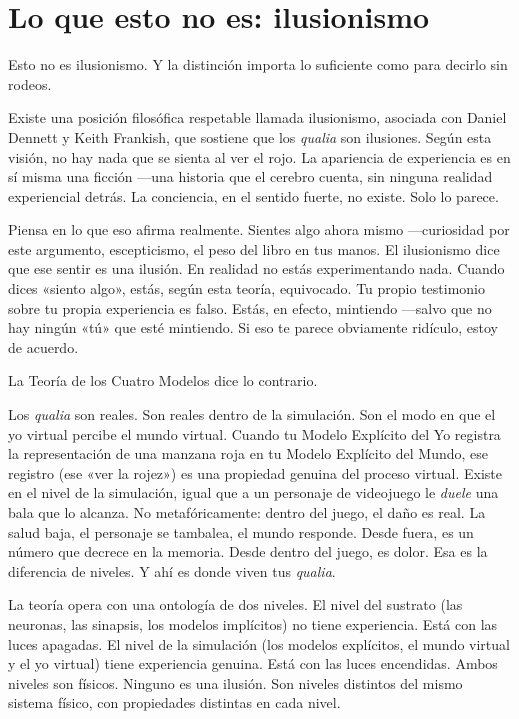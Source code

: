 \documentclass[11pt, twoside, openright]{book}
\begin{document}
\section*{Lo que esto no es: ilusionismo}

Esto no es ilusionismo. Y la distinción importa lo suficiente como para decirlo sin rodeos.

Existe una posición filosófica respetable llamada ilusionismo, asociada con Daniel Dennett y Keith Frankish, que sostiene que los \textit{qualia} son ilusiones. Según esta visión, no hay nada que se sienta al ver el rojo. La apariencia de experiencia es en sí misma una ficción ---una historia que el cerebro cuenta, sin ninguna realidad experiencial detrás. La conciencia, en el sentido fuerte, no existe. Solo lo parece.

Piensa en lo que eso afirma realmente. Sientes algo ahora mismo ---curiosidad por este argumento, escepticismo, el peso del libro en tus manos. El ilusionismo dice que ese sentir es una ilusión. En realidad no estás experimentando nada. Cuando dices «siento algo», estás, según esta teoría, equivocado. Tu propio testimonio sobre tu propia experiencia es falso. Estás, en efecto, mintiendo ---salvo que no hay ningún «tú» que esté mintiendo. Si eso te parece obviamente ridículo, estoy de acuerdo.

La Teoría de los Cuatro Modelos dice lo contrario.

Los \textit{qualia} son reales. Son reales dentro de la simulación. Son el modo en que el yo virtual percibe el mundo virtual. Cuando tu Modelo Explícito del Yo registra la representación de una manzana roja en tu Modelo Explícito del Mundo, ese registro (ese «ver la rojez») es una propiedad genuina del proceso virtual. Existe en el nivel de la simulación, igual que a un personaje de videojuego le \textit{duele} una bala que lo alcanza. No metafóricamente: dentro del juego, el daño es real. La salud baja, el personaje se tambalea, el mundo responde. Desde fuera, es un número que decrece en la memoria. Desde dentro del juego, es dolor. Esa es la diferencia de niveles. Y ahí es donde viven tus \textit{qualia}.

La teoría opera con una ontología de dos niveles. El nivel del sustrato (las neuronas, las sinapsis, los modelos implícitos) no tiene experiencia. Está con las luces apagadas. El nivel de la simulación (los modelos explícitos, el mundo virtual y el yo virtual) tiene experiencia genuina. Está con las luces encendidas. Ambos niveles son físicos. Ninguno es una ilusión. Son niveles distintos del mismo sistema físico, con propiedades distintas en cada nivel.
\end{document}
